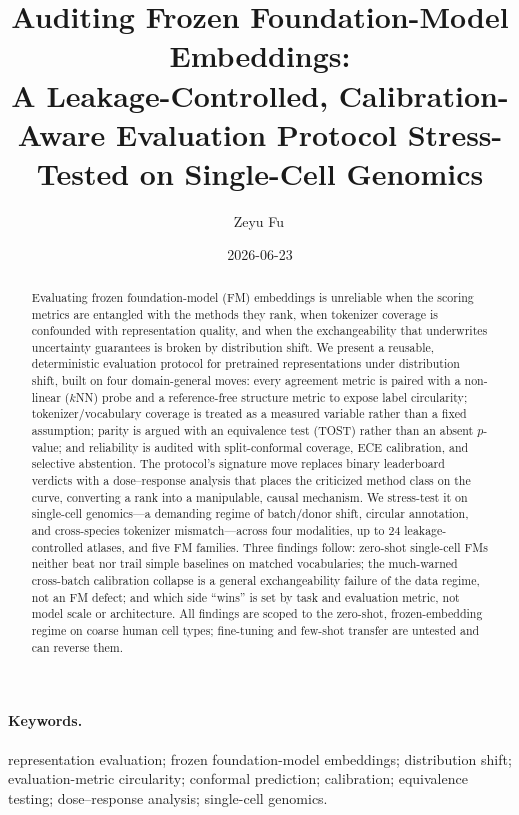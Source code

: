 \documentclass[11pt]{article}
\title{\bfseries Auditing Frozen Foundation-Model Embeddings:\\
A Leakage-Controlled, Calibration-Aware Evaluation Protocol Stress-Tested on Single-Cell Genomics}
\author{Zeyu Fu\,\orcidlink{0009-0001-8329-0108}}
\affil{\normalsize State Key Laboratory of Trauma and Chemical Poisoning, Institute of Combined Injury, Chongqing Engineering Research Center for Nanomedicine, College of Preventive Medicine, Army Medical University, Chongqing, China}
\affil{\normalsize\href{mailto:fuzeyu99@126.com}{fuzeyu99@126.com}}
\date{2026-06-23}
\begin{document}
\maketitle

\begin{abstract}

\noindent Evaluating frozen foundation-model (FM) embeddings is unreliable when the scoring metrics are entangled with the methods they rank, when tokenizer coverage is confounded with representation quality, and when the exchangeability that underwrites uncertainty guarantees is broken by distribution shift. We present a reusable, deterministic evaluation protocol for pretrained representations under distribution shift, built on four domain-general moves: every agreement metric is paired with a non-linear ($k$NN) probe and a reference-free structure metric to expose label circularity; tokenizer/vocabulary coverage is treated as a measured variable rather than a fixed assumption; parity is argued with an equivalence test (TOST) rather than an absent $p$-value; and reliability is audited with split-conformal coverage, ECE calibration, and selective abstention. The protocol's signature move replaces binary leaderboard verdicts with a dose--response analysis that places the criticized method class on the curve, converting a rank into a manipulable, causal mechanism. We stress-test it on single-cell genomics---a demanding regime of batch/donor shift, circular annotation, and cross-species tokenizer mismatch---across four modalities, up to 24 leakage-controlled atlases, and five FM families. Three findings follow: zero-shot single-cell FMs neither beat nor trail simple baselines on matched vocabularies; the much-warned cross-batch calibration collapse is a general exchangeability failure of the data regime, not an FM defect; and which side ``wins'' is set by task and evaluation metric, not model scale or architecture. All findings are scoped to the zero-shot, frozen-embedding regime on coarse human cell types; fine-tuning and few-shot transfer are untested and can reverse them.

\end{abstract}

\paragraph{Keywords.} \footnotesize representation evaluation; frozen foundation-model embeddings; distribution shift; evaluation-metric circularity; conformal prediction; calibration; equivalence testing; dose--response analysis; single-cell genomics. \normalsize
\end{document}
